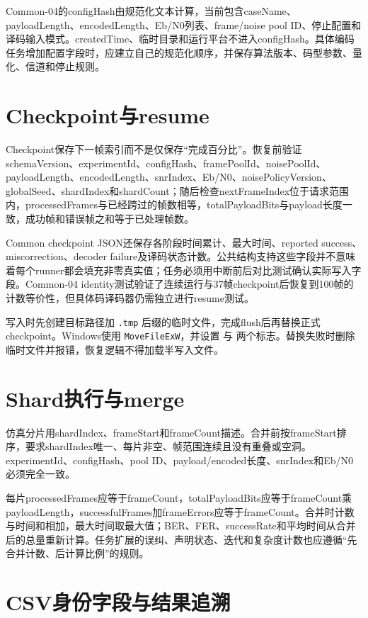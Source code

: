 Common-04的configHash由规范化文本计算，当前包含caseName、payloadLength、encodedLength、Eb/N0列表、frame/noise pool ID、停止配置和译码输入模式。createdTime、临时目录和运行平台不进入configHash。具体编码任务增加配置字段时，应建立自己的规范化顺序，并保存算法版本、码型参数、量化、信道和停止规则。

\section{Checkpoint与resume}

Checkpoint保存下一帧索引而不是仅保存“完成百分比”。恢复前验证schemaVersion、experimentId、configHash、framePoolId、noisePoolId、payloadLength、encodedLength、snrIndex、Eb/N0、noisePolicyVersion、globalSeed、shardIndex和shardCount；随后检查nextFrameIndex位于请求范围内，processedFrames与已经跨过的帧数相等，totalPayloadBits与payload长度一致，成功帧和错误帧之和等于已处理帧数。

Common checkpoint JSON还保存各阶段时间累计、最大时间、reported success、miscorrection、decoder failure及译码状态计数。公共结构支持这些字段并不意味着每个runner都会填充非零真实值；任务必须用中断前后对比测试确认实际写入字段。Common-04 identity测试验证了连续运行与37帧checkpoint后恢复到100帧的计数等价性，但具体码译码器仍需独立进行resume测试。

写入时先创建目标路径加 \texttt{.tmp} 后缀的临时文件，完成flush后再替换正式checkpoint。Windows使用 \texttt{MoveFileExW}，并设置  与  两个标志。替换失败时删除临时文件并报错，恢复逻辑不得加载半写入文件。

\section{Shard执行与merge}

仿真分片用shardIndex、frameStart和frameCount描述。合并前按frameStart排序，要求shardIndex唯一、每片非空、帧范围连续且没有重叠或空洞。experimentId、configHash、pool ID、payload/encoded长度、snrIndex和Eb/N0必须完全一致。

每片processedFrames应等于frameCount，totalPayloadBits应等于frameCount乘payloadLength，successfulFrames加frameErrors应等于frameCount。合并时计数与时间和相加，最大时间取最大值；BER、FER、successRate和平均时间从合并后的总量重新计算。任务扩展的误纠、声明状态、迭代和复杂度计数也应遵循“先合并计数、后计算比例”的规则。

\section{CSV身份字段与结果追溯}

